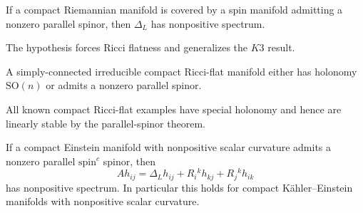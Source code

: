 \begin{theorem}
\label{thm:chow-iv-parallel-spinor-stability}

If a compact Riemannian manifold is covered by a spin manifold admitting a
nonzero parallel spinor, then $\Delta_L$ has nonpositive spectrum.
\end{theorem}

\begin{remark}
\label{rem:chow-iv-parallel-spinor-rigidity}


The hypothesis forces Ricci flatness and generalizes the $K3$ result.
\end{remark}

\begin{proposition}
\label{prop:chow-iv-ricci-flat-holonomy}

A simply-connected irreducible compact Ricci-flat manifold either has holonomy
$\mathrm{SO}(n)$ or admits a nonzero parallel spinor.
\end{proposition}

\begin{remark}
\label{rem:chow-iv-known-ricci-flat-stability}

All known compact Ricci-flat examples have special holonomy and hence are
linearly stable by the parallel-spinor theorem.
\end{remark}

\begin{theorem}
\label{thm:chow-iv-spinc-linear-stability}

If a compact Einstein manifold with nonpositive scalar curvature admits a
nonzero parallel $\mathrm{spin}^c$ spinor, then
\[
 Ah_{ij}=\Delta_Lh_{ij}+R_i{}^kh_{kj}+R_j{}^kh_{ik}
\]
has nonpositive spectrum.  In particular this holds for compact
K\"ahler--Einstein manifolds with nonpositive scalar curvature.
\end{theorem}

